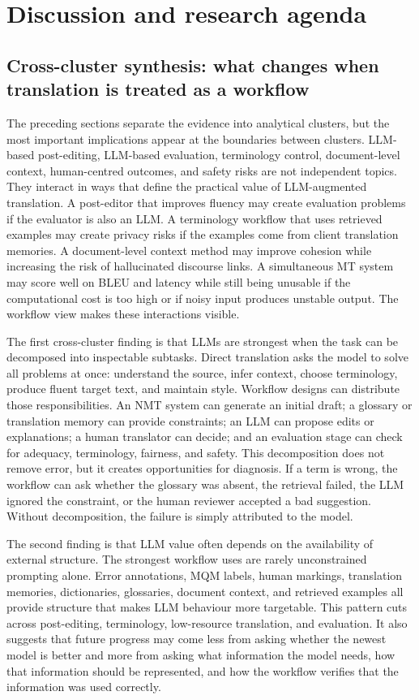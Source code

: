 \documentclass[11pt]{article}
\begin{document}
\section{Discussion and research agenda}
\subsection{Cross-cluster synthesis: what changes when translation is treated as a workflow}
The preceding sections separate the evidence into analytical clusters, but the most important implications appear at the boundaries between clusters. LLM-based post-editing, LLM-based evaluation, terminology control, document-level context, human-centred outcomes, and safety risks are not independent topics. They interact in ways that define the practical value of LLM-augmented translation. A post-editor that improves fluency may create evaluation problems if the evaluator is also an LLM. A terminology workflow that uses retrieved examples may create privacy risks if the examples come from client translation memories. A document-level context method may improve cohesion while increasing the risk of hallucinated discourse links. A simultaneous MT system may score well on BLEU and latency while still being unusable if the computational cost is too high or if noisy input produces unstable output. The workflow view makes these interactions visible.

The first cross-cluster finding is that LLMs are strongest when the task can be decomposed into inspectable subtasks. Direct translation asks the model to solve all problems at once: understand the source, infer context, choose terminology, produce fluent target text, and maintain style. Workflow designs can distribute those responsibilities. An NMT system can generate an initial draft; a glossary or translation memory can provide constraints; an LLM can propose edits or explanations; a human translator can decide; and an evaluation stage can check for adequacy, terminology, fairness, and safety. This decomposition does not remove error, but it creates opportunities for diagnosis. If a term is wrong, the workflow can ask whether the glossary was absent, the retrieval failed, the LLM ignored the constraint, or the human reviewer accepted a bad suggestion. Without decomposition, the failure is simply attributed to the model.

The second finding is that LLM value often depends on the availability of external structure. The strongest workflow uses are rarely unconstrained prompting alone. Error annotations, MQM labels, human markings, translation memories, dictionaries, glossaries, document context, and retrieved examples all provide structure that makes LLM behaviour more targetable. This pattern cuts across post-editing, terminology, low-resource translation, and evaluation. It also suggests that future progress may come less from asking whether the newest model is better and more from asking what information the model needs, how that information should be represented, and how the workflow verifies that the information was used correctly.
\end{document}
